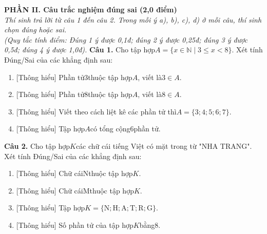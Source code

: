 \documentclass[11pt,a4paper]{article}
\begin{document}
\vspace{6pt}
\noindent
\textbf{\large PHẦN II. Câu trắc nghiệm đúng sai (2,0 điểm)}\\
\textit{\small Thí sinh trả lời từ câu 1 đến câu 2. Trong mỗi ý a), b), c), d) ở mỗi câu, thí sinh chọn đúng hoặc sai.}\\
\textit{\small (Quy tắc tính điểm: Đúng 1 ý được 0,1đ; đúng 2 ý được 0,25đ; đúng 3 ý được 0,5đ; đúng 4 ý được 1,0đ).}
\vspace{6pt}
\noindent\textbf{Câu 1.} Cho tập hợp$A = \{x \in \mathbb{N} \mid 3 \le x < 8\}$. Xét tính Đúng/Sai của các khẳng định sau:\par\vspace{2pt}
\begin{enumerate}[label=\textbf{\alph*)}, leftmargin=1.2cm, itemsep=2pt, topsep=2pt]
  \item \textnormal{[Thông hiểu]} Phần tử$3$thuộc tập hợp$A$, viết là$3 \in A$.
  \item \textnormal{[Thông hiểu]} Phần tử$8$thuộc tập hợp$A$, viết là$8 \in A$.
  \item \textnormal{[Thông hiểu]} Viết theo cách liệt kê các phần tử thì$A = \{3; 4; 5; 6; 7\}$.
  \item \textnormal{[Thông hiểu]} Tập hợp$A$có tổng cộng$6$phần tử.
\end{enumerate}
\vspace{6pt}

\noindent\textbf{Câu 2.} Cho tập hợp$K$các chữ cái tiếng Việt có mặt trong từ "NHA TRANG". Xét tính Đúng/Sai của các khẳng định sau:\par\vspace{2pt}
\begin{enumerate}[label=\textbf{\alph*)}, leftmargin=1.2cm, itemsep=2pt, topsep=2pt]
  \item \textnormal{[Thông hiểu]} Chữ cái$\text{N}$thuộc tập hợp$K$.
  \item \textnormal{[Thông hiểu]} Chữ cái$\text{M}$thuộc tập hợp$K$.
  \item \textnormal{[Thông hiểu]} Tập hợp$K = \{\text{N}; \text{H}; \text{A}; \text{T}; \text{R}; \text{G}\}$.
  \item \textnormal{[Thông hiểu]} Số phần tử của tập hợp$K$bằng$8$.
\end{enumerate}
\vspace{6pt}
\end{document}
